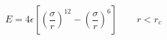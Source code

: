 


$$
 E = 4 \epsilon \left[ \left(\frac{\sigma}{r}\right)^{12} - 
                       \left(\frac{\sigma}{r}\right)^6 \right]
                       \qquad r < r_c
$$



